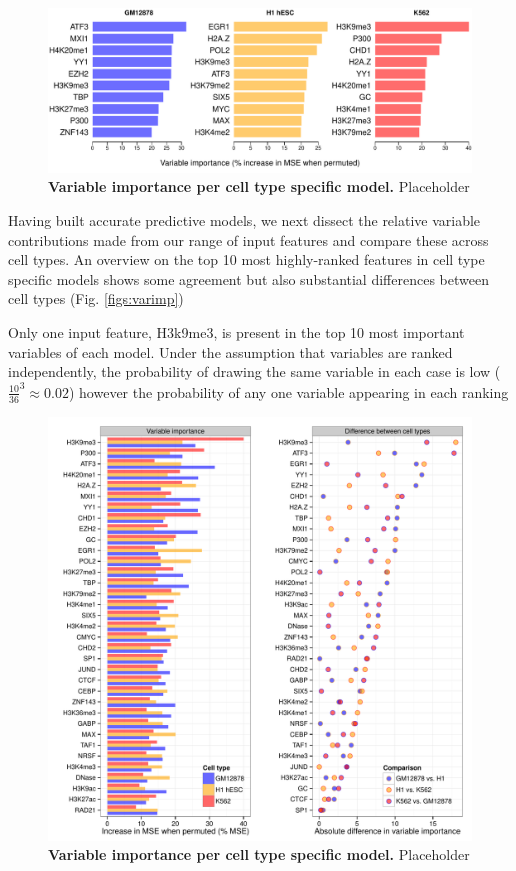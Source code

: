 \documentclass[a4paper,11pt,oneside]{book}
\begin{document}
\begin{figure}
\begin{center} 
\includegraphics[width=\textwidth]{figs/varimp.pdf}
\captionsetup{width=\textwidth} 
\caption{ {\bf Variable importance per cell type specific model. }
Placeholder
}\label{fig:varimp}
\end{center} 
\end{figure} 

Having built accurate predictive models, we next dissect the relative variable contributions made from our range of input features and compare these across cell types. An overview on the top 10 most highly-ranked features in cell type specific models shows some agreement but also substantial differences between cell types (Fig. \ref{figs:varimp})

Only one input feature, H3k9me3, is present in the top 10 most important variables of each model. Under the assumption that variables are ranked independently, the probability of drawing the same variable in each case is low (${\frac{10}{36}}^3 \approx 0.02$) however the probability of any one variable appearing in each ranking 

\begin{figure}
\begin{center} 
\includegraphics[width=\textwidth]{figs/varimp_diff.pdf}
\captionsetup{width=\textwidth} 
\caption{ {\bf Variable importance per cell type specific model. }
Placeholder
}\label{fig:varimp_diff}
\end{center} 
\end{figure} 
\end{document}
